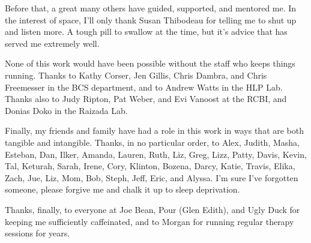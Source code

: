 \begin{acknowledgments}
  Before that, a great many others have guided, supported, and mentored me. In
  the interest of space, I'll only thank Susan Thibodeau for telling me to shut
  up and listen more. A tough pill to swallow at the time, but it's advice that
  has served me extremely well.

  None of this work would have been possible without the staff who keeps things
  running. Thanks to Kathy Corser, Jen Gillis, Chris Dambra, and Chris
  Freemesser in the BCS department, and to Andrew Watts in the HLP Lab. Thanks
  also to Judy Ripton, Pat Weber, and Evi Vanoost at the RCBI, and Donias Doko
  in the Raizada Lab.

  Finally, my friends and family have had a role in this work in ways that are
  both tangible and intangible. Thanks, in no particular order, to Alex, Judith,
  Masha, Esteban, Dan, Ilker, Amanda, Lauren, Ruth, Liz, Greg, Lizz, Patty,
  Davis, Kevin, Tal, Keturah, Sarah, Irene, Cory, Klinton, Bozena, Darcy, Katie,
  Travis, Elika, Zach, Jue, Liz, Mom, Bob, Steph, Jeff, Eric, and Alyssa. I'm
  sure I've forgotten someone, please forgive me and chalk it up to sleep
  deprivation.

  Thanks, finally, to everyone at Joe Bean, Pour (Glen Edith), and Ugly Duck for
  keeping me sufficiently caffeinated, and to Morgan for running regular therapy
  sessions for years.
  
\end{acknowledgments}
